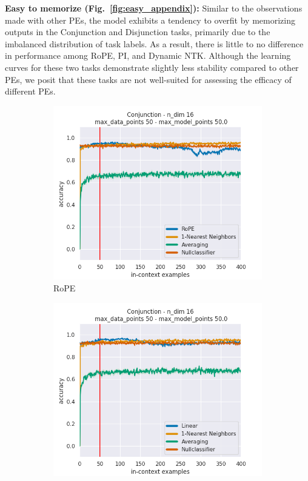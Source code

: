 \documentclass[letterpaper]{article} %
\begin{document}
\textbf{Easy to memorize (Fig.~\ref{fig:easy_appendix}):} Similar to the observations made with other PEs, the model exhibits a tendency to overfit by memorizing outputs in the Conjunction and Disjunction tasks, primarily due to the imbalanced distribution of task labels. As a result, there is little to no difference in performance among RoPE, PI, and Dynamic NTK. Although the learning curves for these two tasks demonstrate slightly less stability compared to other PEs, we posit that these tasks are not well-suited for assessing the efficacy of different PEs.

\begin{figure}[tp]
    \centering
    \begin{subfigure}[t]{0.32\linewidth}
        \includegraphics[width=\linewidth]{AnonymousSubmission/LaTeX/imgs/appendix/conjunction/rope.png}
        \caption{RoPE}
    \end{subfigure}
    \begin{subfigure}[t]{0.32\linewidth}
        \includegraphics[width=\linewidth]{AnonymousSubmission/LaTeX/imgs/appendix/conjunction/linear.png}

\end{subfigure}
\end{figure}
\end{document}
